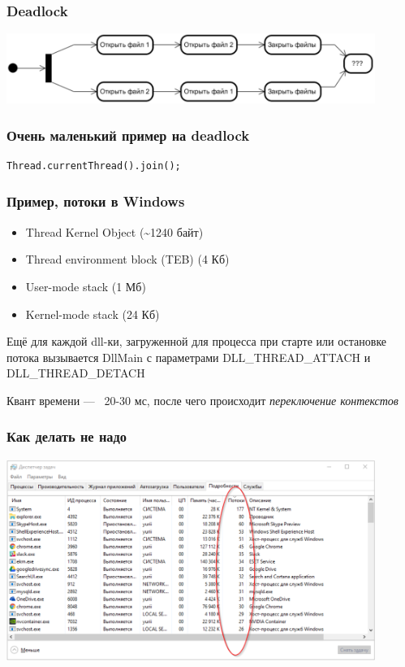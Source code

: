 \documentclass[xetex,mathserif,serif]{beamer}
\begin{document}
	\begin{frame}
		\frametitle{Deadlock}
		\begin{center}
			\includegraphics[width=0.9\textwidth]{deadlock.png}
		\end{center}
	\end{frame}

	\begin{frame}[fragile]
		\frametitle{Очень маленький пример на deadlock}
		\begin{footnotesize}
			\begin{verbatim}
Thread.currentThread().join();
			\end{verbatim}
		\end{footnotesize}
	\end{frame}

	\begin{frame}
		\frametitle{Пример, потоки в Windows}
		\begin{itemize}
			\item Thread Kernel Object (\textasciitilde1240 байт)
			\item Thread environment block (TEB) (4 Кб)
			\item User-mode stack (1 Мб)
			\item Kernel-mode stack (24 Кб)
		\end{itemize}

		Ещё для каждой dll-ки, загруженной для процесса при старте или остановке потока вызывается DllMain с параметрами DLL\_THREAD\_ATTACH и DLL\_THREAD\_DETACH

		\vspace{3mm}
		Квант времени --- ~20-30 мс, после чего происходит \textit{переключение контекстов}
	\end{frame}

	\begin{frame}
		\frametitle{Как делать не надо}
		\begin{center}
			\includegraphics[width=0.9\textwidth]{threadsEverywhere.png}
		\end{center}
	\end{frame}
\end{document}
